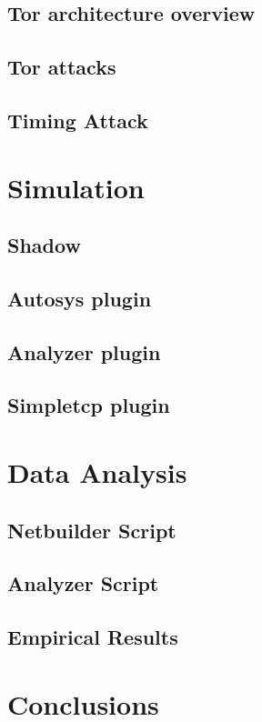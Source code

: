 \documentclass[a4paper]{article}
\begin{document}
\subsection{Tor architecture overview}
\subsection{Tor attacks}

\subsection{Timing Attack}

\section{Simulation}
\label{sec:simulation}
\subsection{Shadow}
\subsection{Autosys plugin}
\subsection{Analyzer plugin}
\subsection{Simpletcp plugin}

\section{Data Analysis}
\subsection{Netbuilder Script}
\subsection{Analyzer Script}
\subsection{Empirical Results}

\section{Conclusions}
\end{document}

